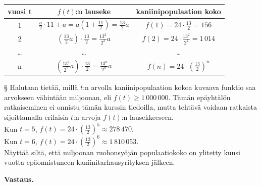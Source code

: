 \begin{esimerkki}
{\begin{tabular}{|c|c|c|}                                                     \hline
\textbf{vuosi t} & \textbf{$f(t)$:n lauseke} & \textbf{kaniinipopulaation koko}\\ \hline
1 &   $\frac{a}{2}\cdot11 + a = a(1+\frac{11}{2}) = \frac{13}{2}a$ & $f(1)=24\cdot\frac{13}{2}= 156$ \\ \hline 
2 &   $\left(\frac{13}{2}a\right)\cdot\frac{13}{2}= \frac{13^2}{2^2}a$  & $f(2)=24\cdot\frac{13^2}{2^2}= 1\,014$\\ \hline 
\ldots  & 		\ldots	&	\ldots	 \\ \hline
n &   $\left(\frac{13^2}{2^2}a\right)\cdot\frac{13}{2} = \frac{13^n}{2^n}a$   & $f(n)=24\cdot\left(\frac{13}{2}\right)^n$\\ \hline 
    \end{tabular}
 
§ Halutaan tietää, millä $t$:n arvolla kaniinipopulaation kokoa kuvaava funktio saa arvokseen vähintään miljoonan, eli $f(t)\geq1\,000\,000$. Tämän epäyhtälön ratkaiseminen ei onnistu tämän kurssin tiedoilla, mutta tehtävä voidaan ratkaista sijoittamalla
erilaisia $t$:n arvoja $f(t)$:n lausekkeeseen.\\
Kun $t=5$, $f(t)=24\cdot\left(\frac{13}{2}\right)^5 \approx 278\,470$. \\
Kun $t=6$, $f(t)=24\cdot\left(\frac{13}{2}\right)^6 \approx 1\,810\,053$. \\

Näyttää siltä, että miljoonan ruohonsyöjän populaatiokoko on ylitetty kuusi vuotta epäonnistuneen kaniinitarhausyrityksen jälkeen.
}

\textbf{Vastaus.}

\end{esimerkki}
